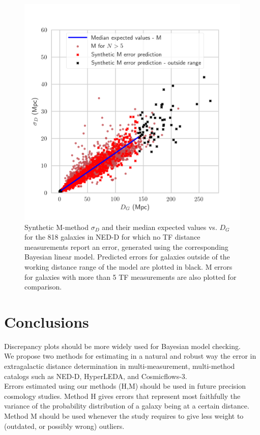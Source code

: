 \documentclass[a4paper,fleqn,usenatbib]{mnras}
\begin{document}
\begin{figure}
	\includegraphics[scale=0.7]{predl2.png}
    \caption{Synthetic M-method $\sigma_D$ and their median expected values vs. $D_G$ for the 818 galaxies in NED-D for which no TF distance measurements report an error, generated using the corresponding Bayesian linear model. Predicted errors for galaxies outside of the working distance range of the model are plotted in black. M errors for galaxies with more than 5 TF measurements are also plotted for comparison.}
    \label{fig:predl2}
\end{figure}

\section{Conclusions}

Discrepancy plots should be more widely used for Bayesian model checking.\\

We propose two methods for estimating in a natural and robust way the error in extragalactic distance determination in multi-measurement, multi-method catalogs such as NED-D, HyperLEDA, and Cosmicflows-3.\\

Errors estimated using our methods (H,M) should be used in future precision cosmology studies. Method H gives errors that represent most faithfully the variance of the probability distribution of a galaxy being at a certain distance. Method M should be used whenever the study requires to give less weight to (outdated, or possibly wrong) outliers.\\
\end{document}
